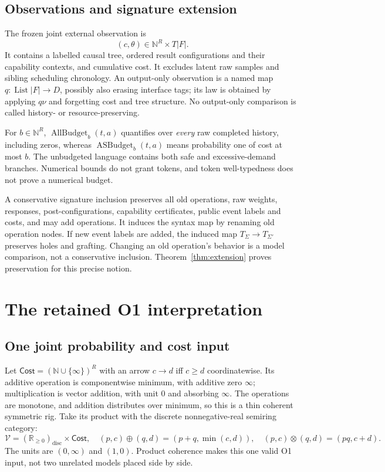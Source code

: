 \documentclass[11pt,a4paper]{article}
\theoremstyle{definition}
\newcommand{\List}{\operatorname{List}}
\newcommand{\Cost}{\mathsf{Cost}}
\newcommand{\AllBudget}{\operatorname{AllBudget}}
\newcommand{\ASBudget}{\operatorname{ASBudget}}
\begin{document}
\subsection{Observations and signature extension}
The frozen joint external observation is
\begin{equation}\label{eq:observation}
 (c,\theta)\in\mathbb N^R\times T|F|.
\end{equation}
It contains a labelled causal tree, ordered result configurations and their
capability contexts, and cumulative cost. It excludes latent raw samples
and sibling scheduling chronology. An output-only observation is a named
map $q:\List|F|\to D$, possibly also erasing interface tags; its law is
obtained by applying $q\nu$ and forgetting cost and tree structure.
No output-only comparison is called history- or resource-preserving.

For $b\in\mathbb N^R$, $\AllBudget_b(t,a)$ quantifies over \emph{every}
raw completed history, including zeros, whereas $\ASBudget_b(t,a)$ means
probability one of cost at most $b$. The unbudgeted language contains both
safe and excessive-demand branches. Numerical bounds do not grant tokens,
and token well-typedness does not prove a numerical budget.

A conservative signature inclusion preserves all old operations, raw
weights, responses, post-configurations, capability certificates, public
event labels and costs, and may add operations. It induces the syntax map
by renaming old operation nodes. If new event labels are added, the induced
map $T_\Sigma\to T_{\Sigma'}$ preserves holes and grafting. Changing an old
operation's behavior is a model comparison, not a conservative inclusion.
Theorem~\ref{thm:extension} proves preservation for this precise notion.

\section{The retained O1 interpretation}\label{sec:integration}

\subsection{One joint probability and cost input}
Let $\Cost=(\mathbb N\cup\{\infty\})^R$ with an arrow $c\to d$ iff
$c\ge d$ coordinatewise. Its additive operation is componentwise minimum,
with additive zero $\infty$; multiplication is vector addition, with unit
$0$ and absorbing $\infty$. The operations are monotone, and addition
distributes over minimum, so this is a thin coherent symmetric rig.
Take its product with the discrete nonnegative-real semiring category:
\begin{equation}\label{eq:rig}
 \mathcal V=(\mathbb R_{\ge0})_{\mathrm{disc}}\times\Cost,
 \quad(p,c)\oplus(q,d)=(p+q,\min(c,d)),
 \quad(p,c)\otimes(q,d)=(pq,c+d).
\end{equation}
The units are $(0,\infty)$ and $(1,0)$. Product coherence makes this one
valid O1 input, not two unrelated models placed side by side.
\end{document}
